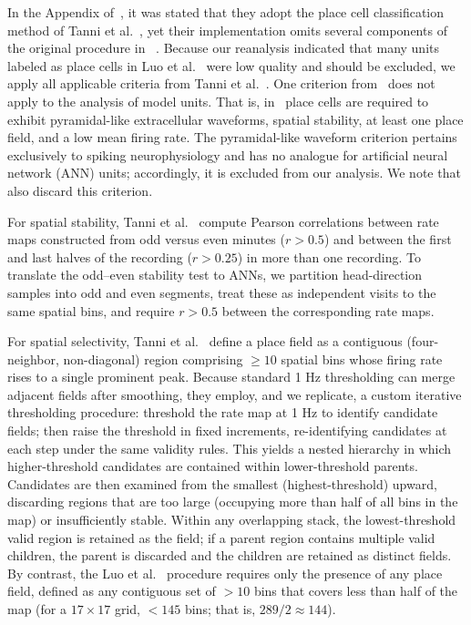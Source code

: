 \documentclass[11pt]{article}
\begin{document}
In the Appendix of~\cite{Luo2024}, it was stated that they adopt the place cell classification method of Tanni et al.~\cite{Tanni2022}, yet their implementation omits several components of the original procedure in ~\cite{Tanni2022}. Because our reanalysis indicated that many units labeled as place cells in Luo et al.~\cite{Luo2024} were low quality and should be excluded, we apply all applicable criteria from Tanni et al.~\cite{Tanni2022}. One criterion from~\cite{Tanni2022} does not apply to the analysis of model units. That is, in~\cite{Tanni2022} place cells are required to exhibit pyramidal-like extracellular waveforms, spatial stability, at least one place field, and a low mean firing rate. The pyramidal-like waveform criterion pertains exclusively to spiking neurophysiology and has no analogue for artificial neural network (ANN) units; accordingly, it is excluded from our analysis. We note that \cite{Luo2024} also discard this criterion.

For spatial stability, Tanni et al.~\cite{Tanni2022} compute Pearson correlations between rate maps constructed from odd versus even minutes ($r > 0.5$) and between the first and last halves of the recording ($r > 0.25$) in more than one recording. To translate the odd–even stability test to ANNs, we partition head-direction samples into odd and even segments, treat these as independent visits to the same spatial bins, and require $r > 0.5$ between the corresponding rate maps.

For spatial selectivity, Tanni et al.~\cite{Tanni2022} define a place field as a contiguous (four-neighbor, non-diagonal) region comprising $\geq 10$ spatial bins whose firing rate rises to a single prominent peak. Because standard 1 Hz thresholding can merge adjacent fields after smoothing, they employ, and we replicate, a custom iterative thresholding procedure: threshold the rate map at 1 Hz to identify candidate fields; then raise the threshold in fixed increments, re-identifying candidates at each step under the same validity rules. This yields a nested hierarchy in which higher-threshold candidates are contained within lower-threshold parents. Candidates are then examined from the smallest (highest-threshold) upward, discarding regions that are too large (occupying more than half of all bins in the map) or insufficiently stable. Within any overlapping stack, the lowest-threshold valid region is retained as the field; if a parent region contains multiple valid children, the parent is discarded and the children are retained as distinct fields. By contrast, the Luo et al.~\cite{Luo2024} procedure requires only the presence of any place field, defined as any contiguous set of $> 10$ bins that covers less than half of the map (for a $17 \times 17$ grid, $< 145$ bins; that is, $289/2 \approx 144$).
\end{document}
